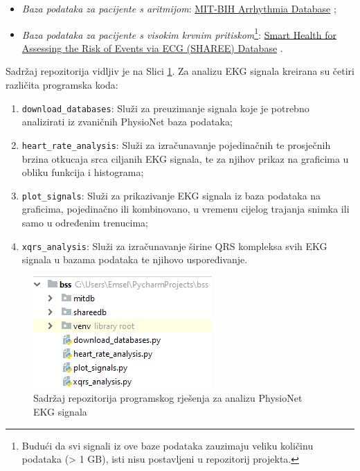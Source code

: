 \documentclass[12pt,a4paper]{article}
\begin{document}
\begin{itemize}
\renewcommand\labelitemi{-}

\item \textit{Baza podataka za pacijente s aritmijom}: \href{https://physionet.org/physiobank/database/mitdb/}{MIT-BIH Arrhythmia Database} \cite{mit-bih};

\item \textit{Baza podataka za pacijente s visokim krvnim pritiskom}\footnote{Budući da svi signali iz ove baze podataka zauzimaju veliku količinu podataka (> 1 GB), isti nisu postavljeni u repozitorij projekta.}: \href{https://physionet.org/physiobank/database/shareedb/}{Smart Health for Assessing the Risk of Events via ECG (SHAREE) Database} \cite{sharee}.

\end{itemize}

Sadržaj repozitorija vidljiv je na Slici \ref{repository}. Za analizu EKG signala kreirana su četiri različita programska koda:

\begin{enumerate}

\item \texttt{download\_databases}: Služi za preuzimanje signala koje je potrebno analizirati iz zvaničnih PhysioNet baza podataka;

\item \texttt{heart\_rate\_analysis}: Služi za izračunavanje pojedinačnih te prosječnih brzina otkucaja srca ciljanih EKG signala, te za njihov prikaz na graficima u obliku funkcija i histograma;

\item \texttt{plot\_signals}: Služi za prikazivanje EKG signala iz baza podataka na graficima, pojedinačno ili kombinovano, u vremenu cijelog trajanja snimka ili samo u određenim trenucima;

\item \texttt{xqrs\_analysis}: Služi za izračunavanje širine QRS kompleksa svih EKG signala u bazama podataka te njihovo uspoređivanje.

\end{enumerate}

\begin{figure}[H]
\center
\includegraphics[scale=0.7]{../res/repository.PNG}
\caption{Sadržaj repozitorija programskog rješenja za analizu PhysioNet EKG signala}
\label{repository}
\end{figure}
\end{document}
